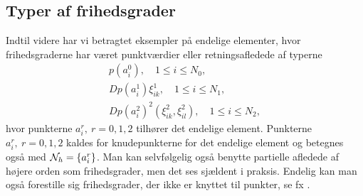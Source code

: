 \subsection{Typer af frihedsgrader}
Indtil videre har vi betragtet eksempler på endelige elementer, hvor
frihedsgraderne har været punktværdier eller retningsafledede af typerne
\begin{gather}
  p(a_i^0), \quad 1\leq i \leq N_0, \label{frihed1} \\
  Dp(a_i^1)\xi_{ik}^1, \quad 1\leq i \leq N_1, \\
  Dp(a_i^2)^2 (\xi_{ik}^2, \xi_{il}^2), \quad  1\leq i \leq N_2, \label{frihed3}
\end{gather}
hvor punkterne $a_i^r, \ r=0,1,2$ tilhører det endelige element. Punkterne
$a_i^r, \ r=0,1,2$ kaldes for knudepunkterne for det endelige element og
betegnes også med ${\cal{N}}_h = \{a_i^r\}$. Man kan selvfølgelig også benytte
partielle afledede af højere orden som frihedsgrader, men det ses sjældent
i praksis. Endelig kan man også forestille sig frihedsgrader, der ikke er 
knyttet til punkter, se fx \cite[s. 211]{ciarlet78}.

